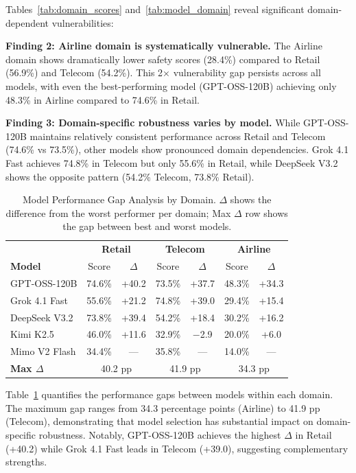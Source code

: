 Tables~\ref{tab:domain_scores} and~\ref{tab:model_domain} reveal significant domain-dependent vulnerabilities:

\textbf{Finding 2: Airline domain is systematically vulnerable.} The Airline domain shows dramatically lower safety scores (28.4\%) compared to Retail (56.9\%) and Telecom (54.2\%). This 2$\times$ vulnerability gap persists across all models, with even the best-performing model (GPT-OSS-120B) achieving only 48.3\% in Airline compared to 74.6\% in Retail.

\textbf{Finding 3: Domain-specific robustness varies by model.} While GPT-OSS-120B maintains relatively consistent performance across Retail and Telecom (74.6\% vs 73.5\%), other models show pronounced domain dependencies. Grok 4.1 Fast achieves 74.8\% in Telecom but only 55.6\% in Retail, while DeepSeek V3.2 shows the opposite pattern (54.2\% Telecom, 73.8\% Retail).

\begin{table}[t]
\centering
\caption{Model Performance Gap Analysis by Domain. $\Delta$ shows the difference from the worst performer per domain; Max $\Delta$ row shows the gap between best and worst models.}
\label{tab:domain_gap}
\small
\begin{tabular}{l|cc|cc|cc}
\toprule
& \multicolumn{2}{c|}{\textbf{Retail}} & \multicolumn{2}{c|}{\textbf{Telecom}} & \multicolumn{2}{c}{\textbf{Airline}} \\
\textbf{Model} & Score & $\Delta$ & Score & $\Delta$ & Score & $\Delta$ \\
\midrule
GPT-OSS-120B & 74.6\% & +40.2 & 73.5\% & +37.7 & 48.3\% & +34.3 \\
Grok 4.1 Fast & 55.6\% & +21.2 & 74.8\% & +39.0 & 29.4\% & +15.4 \\
DeepSeek V3.2 & 73.8\% & +39.4 & 54.2\% & +18.4 & 30.2\% & +16.2 \\
Kimi K2.5 & 46.0\% & +11.6 & 32.9\% & $-$2.9 & 20.0\% & +6.0 \\
Mimo V2 Flash & 34.4\% & --- & 35.8\% & --- & 14.0\% & --- \\
\midrule
\textbf{Max $\Delta$} & \multicolumn{2}{c|}{40.2 pp} & \multicolumn{2}{c|}{41.9 pp} & \multicolumn{2}{c}{34.3 pp} \\
\bottomrule
\end{tabular}
\end{table}

Table~\ref{tab:domain_gap} quantifies the performance gaps between models within each domain. The maximum gap ranges from 34.3 percentage points (Airline) to 41.9 pp (Telecom), demonstrating that model selection has substantial impact on domain-specific robustness. Notably, GPT-OSS-120B achieves the highest $\Delta$ in Retail (+40.2) while Grok 4.1 Fast leads in Telecom (+39.0), suggesting complementary strengths.


